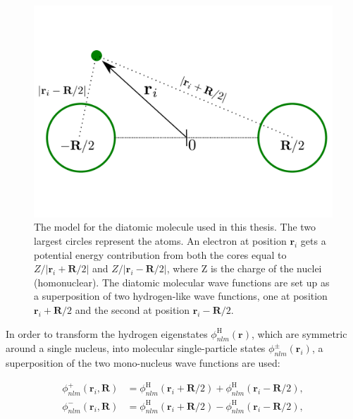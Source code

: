\begin{figure}
 \begin{center}
  \includegraphics[scale=0.3]{../Graphics/Molecules.pdf}
  \caption{The model for the diatomic molecule used in this thesis. The two largest circles represent the atoms. An electron at position $\mathbf{r}_i$ gets a potential energy contribution from both the cores equal to $Z/|\mathbf{r}_i + \mathbf{R}/2|$ and  $Z/|\mathbf{r}_i - \mathbf{R}/2|$, where Z is the charge of the nuclei (homonuclear). The diatomic molecular wave functions are set up as a superposition of two hydrogen-like wave functions, one at position $\mathbf{r}_i + \mathbf{R}/2$ and the second at position $\mathbf{r}_i - \mathbf{R}/2$.}
  \label{fig:dimolecules}
 \end{center}
\end{figure}


In order to transform the hydrogen eigenstates $\phi_{nlm}^\mathrm{H}(\mathbf{r})$, which are symmetric around a single nucleus, into molecular single-particle states $\phi_{nlm}^\pm (\mathbf{r}_i)$, a superposition of the two mono-nucleus wave functions are used:

\begin{align}
 \phi_{nlm}^+ (\mathbf{r}_i, \mathbf{R}) &= \phi_{nlm}^\mathrm{H}(\mathbf{r}_i + \mathbf{R}/2) + \phi_{nlm}^\mathrm{H}(\mathbf{r}_i - \mathbf{R}/2)\label{eq:moleculeTransPlus}, \\
 \phi_{nlm}^- (\mathbf{r}_i, \mathbf{R}) &= \phi_{nlm}^\mathrm{H}(\mathbf{r}_i + \mathbf{R}/2) - \phi_{nlm}^\mathrm{H}(\mathbf{r}_i - \mathbf{R}/2)\label{eq:moleculeTransMin},
\end{align}

